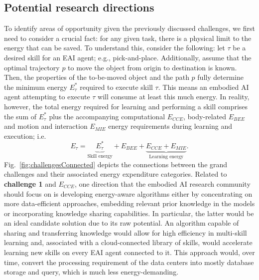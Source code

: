 \subsection{Potential research directions}
To identify areas of opportunity given the previously discussed challenges, we first need to consider a crucial fact: for any given task, there is a physical limit to the energy that can be saved. To understand this, consider the following: let $\tau$ be a desired skill for an EAI agent; e.g., pick-and-place. Additionally, assume that the optimal trajectory $p$ to move the object from origin to destination is known. Then, the properties of the to-be-moved object and the path $p$ fully determine the minimum energy $E^*_{\tau}$ required to execute skill $\tau$. This means an embodied AI agent attempting to execute $\tau$ will consume at least this much energy. In reality, however, the total energy required for learning and performing a skill comprises the sum of $E^*_{\tau}$ plus the accompanying computational $E_{CCE}$, body-related $E_{BEE}$ and motion and interaction $E_{MIE}$ energy requirements during learning and execution; i.e.
\begin{equation}
	E_{\tau} =  \underbrace{E^*_{\tau}}_{\text{Skill energy}} + E_{BEE} + \underbrace{E_{CCE} + E_{MIE}}_{\text{Learning energy}}.
\end{equation}
Fig.~\ref{fig:challengesConnected} depicts the connections between the grand challenges and their associated energy expenditure categories. Related to \textbf{challenge 1} and $E_{CCE}$, one direction that the embodied AI research community should focus on is developing energy-aware algorithms either by concentrating on more data-efficient approaches, embedding relevant prior knowledge in the models or incorporating knowledge sharing capabilities. In particular, the latter would be an ideal candidate solution due to its raw potential. An algorithm capable of sharing and transferring knowledge would allow for high efficiency in multi-skill learning and, associated with a cloud-connected library of skills, would accelerate learning new skills on every EAI agent connected to it. This approach would, over time, convert the processing requirement of the data centers into mostly database storage and query, which is much less energy-demanding.


